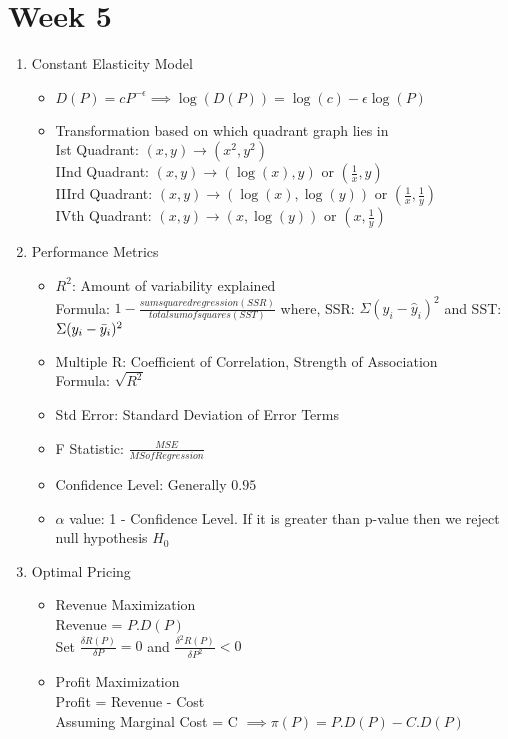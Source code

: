 \documentclass[a4paper]{article}
\begin{document}
 \section{Week 5}
 \begin{enumerate}
     \item Constant Elasticity Model
     \begin{itemize}
         \item $D(P) = cP^{-\epsilon}\implies \log(D(P)) = \log(c) - \epsilon\log(P)$
         \item Transformation based on which quadrant graph lies in \\
         Ist Quadrant: $(x,y) \longrightarrow (x^2,y^2)$\\
         IInd Quadrant: $(x,y) \longrightarrow (\log(x),y)$ or $(\frac{1}{x},y)$\\
         IIIrd Quadrant: $(x,y) \longrightarrow (\log(x),\log(y))$ or $(\frac{1}{x},\frac{1}{y})$\\
         IVth Quadrant: $(x,y) \longrightarrow (x,\log(y))$ or $(x,\frac{1}{y})$
     \end{itemize}
     \item Performance Metrics
     \begin{itemize}
         \item $R^2$: Amount of variability explained\\
         Formula: $1 - \frac{sum squared regression(SSR)}{total sum of squares(SST)}$ where, SSR: $\Sigma(y_i - \hat{y}_i)^2$ and SST: $\Sigma(y_i - \Bar{y}_i)^2$
         \item Multiple R: Coefficient of Correlation, Strength of Association\\
         Formula: $\sqrt{R^2}$
         \item Std Error: Standard Deviation of Error Terms
         \item F Statistic: $\frac{MSE}{MS of Regression}$
         \item Confidence Level: Generally $0.95$
         \item $\alpha$ value: 1 - Confidence Level. If it is greater than p-value then we reject null hypothesis $H_0$
     \end{itemize}
     \item Optimal Pricing
     \begin{itemize}
         \item Revenue Maximization\\
         Revenue = $P.D(P)$\\
         Set $\frac{\delta R(P)}{\delta P} = 0$ and $\frac{\delta^2R(P)}{\delta P^2} < 0$
         \item Profit Maximization\\
         Profit = Revenue - Cost\\
         Assuming Marginal Cost = C $\implies \pi(P) = P.D(P) - C.D(P)$
     \end{itemize}
 \end{enumerate}
\end{document}
